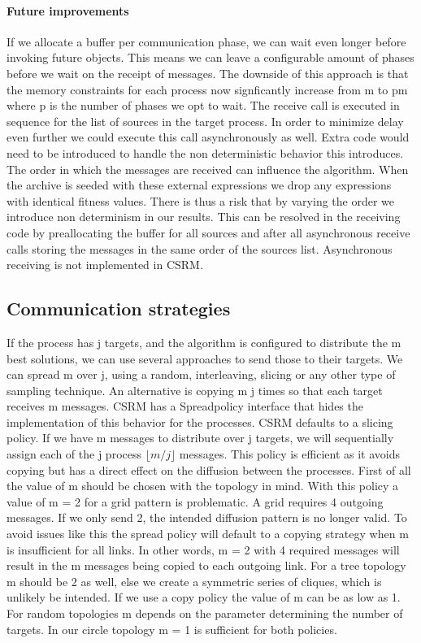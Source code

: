 \paragraph{Future improvements}
If we allocate a buffer per communication phase, we can wait even longer before invoking future objects. This means we can leave a configurable amount of phases before we wait on the receipt of messages. The downside of this approach is that the memory constraints for each process now signficantly increase from m to pm where p is the number of phases we opt to wait.
The receive call is executed in sequence for the list of sources in the target process. In order to minimize delay even further we could execute this call asynchronously as well. Extra code would need to be introduced to handle the non deterministic behavior this introduces. The order in which the messages are received can influence the algorithm. When the archive is seeded with these external expressions we drop any expressions with identical fitness values. There is thus a risk that by varying the order we introduce non determinism in our results. This can be resolved in the receiving code by preallocating the buffer for all sources and after all asynchronous receive calls storing the messages in the same order of the sources list. 
Asynchronous receiving is not implemented in CSRM.

\subsection{Communication strategies}\label{subsec:commstrategies}
If the process has j targets, and the algorithm is configured to distribute the m best solutions, we can use several approaches to send those to their targets. We can spread m over j, using a random, interleaving, slicing or any other type of sampling technique. An alternative is copying m j times so that each target receives m messages.
CSRM has a Spreadpolicy interface that hides the implementation of this behavior for the processes. CSRM defaults to a slicing policy. If we have m messages to distribute over j targets, we will sequentially assign each of the j process $ \lfloor{m/j}\rfloor $ messages.
This policy is efficient as it avoids copying but has a direct effect on the diffusion between the processes. First of all the value of m should be chosen with the topology in mind. With this policy a value of m = 2 for a grid pattern is problematic. A grid requires 4 outgoing messages. If we only send 2, the intended diffusion pattern is no longer valid. To avoid issues like this the spread policy will default to a copying strategy when m is insufficient for all links. In other words, m = 2 with 4 required messages will result in the m messages being copied to each outgoing link. 
For a tree topology m should be 2 as well, else we create a symmetric series of cliques, which is unlikely be intended. If we use a copy policy the value of m can be as low as 1. For random topologies m depends on the parameter determining the number of targets. In our circle topology m = 1 is sufficient for both policies.

